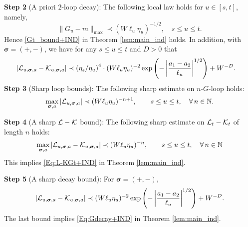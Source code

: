 \documentclass[10pt,reqno]{article}
\theoremstyle{plain} %
\theoremstyle{remark}
\numberwithin{equation}{section}
\begin{document}
 \bigskip
\noindent 
\textbf{Step 2}  (A priori $2$-loop decay): 
 The following local law holds for $u\in [s,t]$, namely, 
 \begin{equation}\label{Gt_bound_flow}
     \|G_u-m\|_{\max}\prec  (W\ell_u\eta_u)^{-1/2},\quad s\le u\le t.
\end{equation} 
Hence \eqref{Gt_bound+IND} in Theorem \ref{lem:main_ind} holds.  
In addition,  with 
 $\boldsymbol{\sigma}=(+,-)$, we have for any   $s\le u\le t$ and $D>0$ that 
 \begin{equation}\label{Eq:Gdecay_w}
\left| {\cal L}_{u, \boldsymbol{\sigma}, \textbf{a}}-{\cal K}_{u, \boldsymbol{\sigma}, \textbf{a}}\right| \prec \left(\eta_s/\eta_u\right)^4\cdot (W\ell_u\eta_u)^{-2}\exp \left(- \left|\frac{ a_1-a_2 }{\ell_u}\right|^{1/2}\right)+W^{-D} . \quad 
\end{equation}
   \bigskip
 \noindent 
\textbf{Step 3}   (Sharp  loop  bounds): 
 The following sharp estimate on $n$-$G$-loop holds: 
\begin{equation}\label{Eq:LGxb}
\max_{\boldsymbol{\sigma}, \textbf{a}}\left| {\cal L}_{u, \boldsymbol{\sigma}, \textbf{a}} \right|
\prec 
  (W\ell_u\eta_u)^{-n+1} ,\quad \quad s\le u\le t, \quad\forall\, n\in \mathbb N.
\end{equation}


 \bigskip
 \noindent 
\textbf{Step 4}  (A sharp  $\cal L - \cal K$  bound): 
The following sharp estimate on $ {\cal L}_t-{\cal K}_t$ of length $n$ holds: 
\begin{equation}\label{Eq:L-KGt-flow}
 \max_{\boldsymbol{\sigma}, \textbf{a}}\left|{\cal L}_{u, \boldsymbol{\sigma}, \textbf{a}}-{\cal K}_{u, \boldsymbol{\sigma}, \textbf{a}}\right|\prec (W\ell_u\eta_u)^{-n},\quad \quad s\le u\le t, \quad \forall\, n\in \mathbb N
\end{equation}
This implies \eqref{Eq:L-KGt+IND} in Theorem  \ref{lem:main_ind}.



 \bigskip
 \noindent 
\textbf{Step 5}  (A sharp decay bound): For  $ \boldsymbol{\sigma}=(+,-)$,
 \begin{equation}\label{Eq:Gdecay_flow}
\left| {\cal L}_{u, \boldsymbol{\sigma}, \textbf{a}}-{\cal K}_{u, \boldsymbol{\sigma}, \textbf{a}}\right| \prec   (W\ell_u\eta_u)^{-2}\exp \left(- \left|\frac{ a_1-a_2 }{\ell_u}\right|^{1/2}\right)+W^{-D}. 
\end{equation}
The last bound implies \eqref{Eq:Gdecay+IND} in Theorem  \ref{lem:main_ind}.
\end{document}
